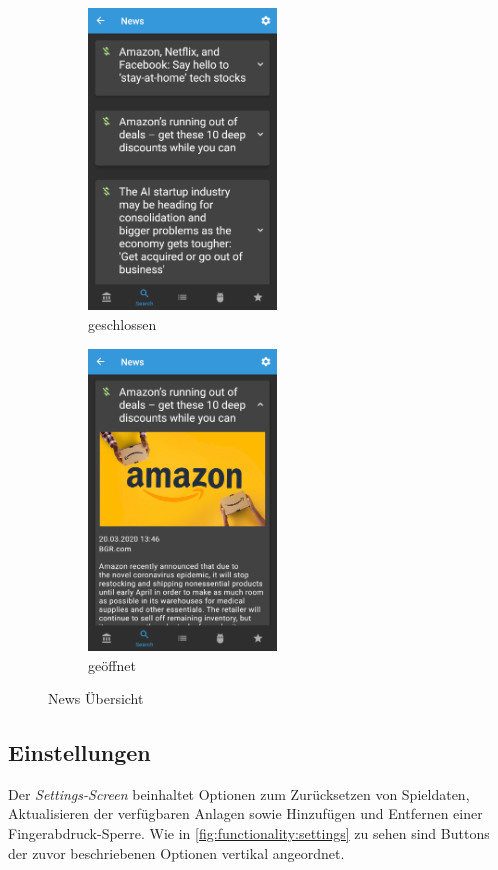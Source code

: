 \documentclass[a4paper]{article}
\begin{document}
\begin{figure}[H]
    \begin{subfigure}{.5\textwidth}
        \centering
        \includegraphics[height=8cm,keepaspectratio]{./images/news/news.png}
        \caption{geschlossen}
        \label{fig:functionality:news:closed}
    \end{subfigure}
    \begin{subfigure}{.5\textwidth}
        \centering
        \includegraphics[height=8cm,keepaspectratio]{./images/news/news_open.png}
        \caption{geöffnet}
        \label{fig:functionality:news:open}
    \end{subfigure}
    \caption{News Übersicht}
    \label{fig:functionality:news}
\end{figure}


\subsection{Einstellungen}
\label{subsec:functionality:settings}
Der \textit{Settings-Screen} beinhaltet Optionen zum Zurücksetzen von Spieldaten, Aktualisieren der verfügbaren Anlagen sowie Hinzufügen und Entfernen einer Fin\-ger\-abdruck-Sperre.
Wie in \autoref{fig:functionality:settings} zu sehen sind Buttons der zuvor beschriebenen Optionen vertikal angeordnet.
\end{document}
